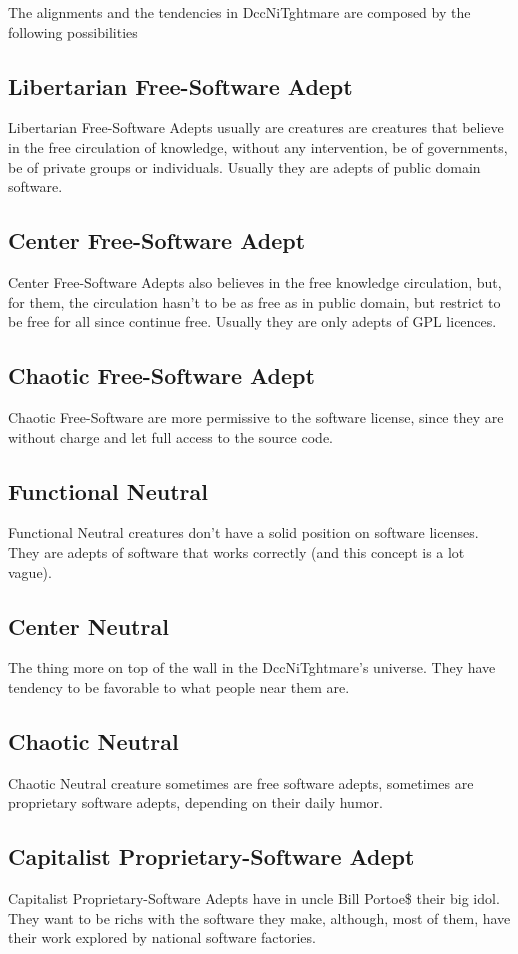 \documentclass[ letterpaper,12pt]{article}
\begin{document}
The alignments and the tendencies in DccNiTghtmare are composed by the following possibilities\\
\subsection{Libertarian Free-Software Adept} Libertarian Free-Software Adepts usually are creatures are creatures that believe in the free circulation of knowledge, without any intervention, be of governments, be of private groups or individuals. Usually they are adepts of public domain software.
\subsection{Center Free-Software Adept} Center Free-Software Adepts also believes in the free knowledge circulation, but, for them, the circulation hasn't to be as free as in public domain, but restrict to be free for all since continue free. Usually they are only adepts of GPL licences.
\subsection{Chaotic Free-Software Adept} Chaotic Free-Software are more permissive to the software license, since they are without charge and let full access to the source code.
\subsection{Functional Neutral} Functional Neutral creatures don't have a solid position on software licenses. They are adepts of software that works correctly (and this concept is a lot vague).
\subsection{Center Neutral} The thing more on top of the wall in the DccNiTghtmare's universe.  They have tendency to be favorable to what people near them are.
\subsection{Chaotic Neutral} Chaotic Neutral creature sometimes are free software adepts, sometimes are proprietary software adepts, depending on their daily humor.
\subsection{Capitalist Proprietary-Software Adept} Capitalist Proprietary-Software Adepts have in uncle Bill Portoe\$ their big idol. They want to be richs with the software they make, although, most of them, have their work explored by national software factories.
\end{document}
